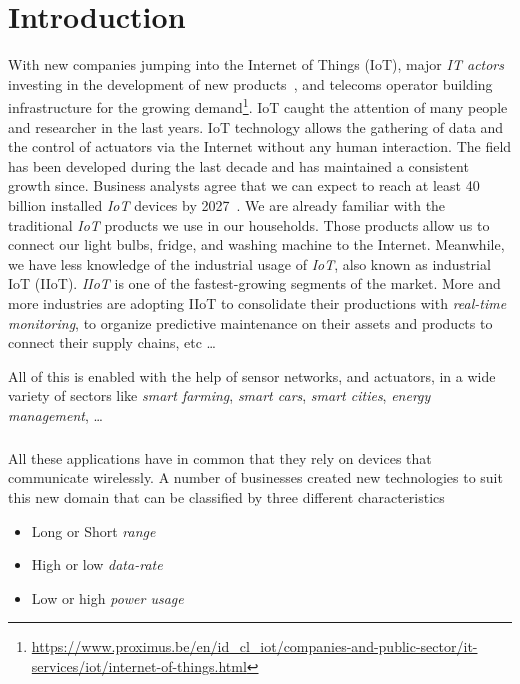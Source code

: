 \chapter{Introduction}

With new companies jumping into the Internet of Things (IoT), 
major \emph{IT actors} investing in the development of new
products~\cite{fortuneiot2019}, and telecoms operator building infrastructure 
for the growing demand\footnote{\url{https://www.proximus.be/en/id_cl_iot/companies-and-public-sector/it-services/iot/internet-of-things.html}}.
IoT caught the attention of many people and researcher in the last years.
IoT technology allows the gathering of data and the control of actuators via
the Internet without any human interaction.
The field has been developed during the last decade and has maintained a
consistent growth since.
Business analysts agree that we can expect to reach at least 40 billion
installed \emph{IoT} devices by 2027~\cite{businessinsider2020}.
We are already familiar with the traditional \emph{IoT} products
we use in our households. Those products allow us to connect our light bulbs,
fridge, and washing machine to the Internet.
Meanwhile, we have less knowledge of the industrial usage of \emph{IoT}, also
known as industrial IoT (IIoT). \emph{IIoT} is one of the fastest-growing
segments of the market.
More and more industries are adopting IIoT to consolidate their productions
with \emph{real-time monitoring}, to organize predictive maintenance on their
assets and products to connect their supply chains, etc \ldots

All of this is enabled with the help of sensor networks, and actuators, in a
wide variety of sectors like \emph{smart farming}, \emph{smart cars},
\emph{smart cities}, \emph{energy management}, \ldots

\paragraph{}

All these applications have in common that they rely on devices that
communicate wirelessly.
A number of businesses created new technologies to suit this new domain 
that can be classified by three different characteristics

\begin{itemize}
    \item Long or Short \emph{range}
    \item High or low \emph{data-rate}
    \item Low or high \emph{power usage} 
\end{itemize}

